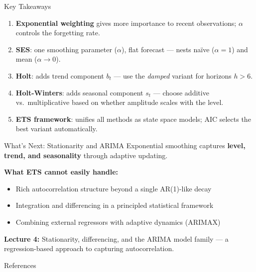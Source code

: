 \documentclass[aspectratio=169, 11pt]{beamer}
\begin{document}
\begin{frame}{Key Takeaways}
  \begin{keybox}
    {\small
    \setlength{\itemsep}{1pt}
    \begin{enumerate}
      \item \textbf{Exponential weighting} gives more importance to recent
            observations; $\alpha$ controls the forgetting rate.
      \item \textbf{SES}: one smoothing parameter ($\alpha$), flat forecast ---
            nests na\"{i}ve ($\alpha{=}1$) and mean ($\alpha{\to}0$).
      \item \textbf{Holt}: adds trend component $b_t$ ---
            use the \emph{damped} variant for horizons $h > 6$.
      \item \textbf{Holt-Winters}: adds seasonal component $s_t$ ---
            choose additive vs.\ multiplicative based on whether
            amplitude scales with the level.
      \item \textbf{ETS framework}: unifies all methods as state space models;
            AIC selects the best variant automatically.
    \end{enumerate}
    }
  \end{keybox}
\end{frame}

\begin{frame}{What's Next: Stationarity and ARIMA}
  Exponential smoothing captures \textbf{level, trend, and seasonality}
  through adaptive updating.

  \vspace{0.15cm}
  \textbf{What ETS cannot easily handle:}
  \begin{itemize}\small
    \item Rich autocorrelation structure beyond a single AR(1)-like decay
    \item Integration and differencing in a principled statistical framework
    \item Combining external regressors with adaptive dynamics (ARIMAX)
  \end{itemize}
  \vspace{0.15cm}
  \begin{keybox}
    \textbf{Lecture 4:} Stationarity, differencing, and the ARIMA model
    family --- a regression-based approach to capturing autocorrelation.
  \end{keybox}
  \begin{center}
  \end{center}
\end{frame}

\begin{frame}[allowframebreaks]{References}
  \printbibliography[heading=none]
\end{frame}
\end{document}

